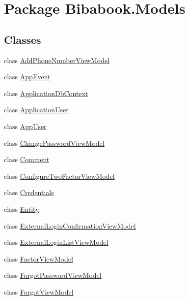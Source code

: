 \hypertarget{namespace_bibabook_1_1_models}{}\section{Package Bibabook.\+Models}
\label{namespace_bibabook_1_1_models}
\subsection*{Classes}
\begin{DoxyCompactItemize}
\item 
class \hyperlink{class_bibabook_1_1_models_1_1_add_phone_number_view_model}{Add\+Phone\+Number\+View\+Model}
\item 
class \hyperlink{class_bibabook_1_1_models_1_1_app_event}{App\+Event}
\item 
class \hyperlink{class_bibabook_1_1_models_1_1_application_db_context}{Application\+Db\+Context}
\item 
class \hyperlink{class_bibabook_1_1_models_1_1_application_user}{Application\+User}
\item 
class \hyperlink{class_bibabook_1_1_models_1_1_app_user}{App\+User}
\item 
class \hyperlink{class_bibabook_1_1_models_1_1_change_password_view_model}{Change\+Password\+View\+Model}
\item 
class \hyperlink{class_bibabook_1_1_models_1_1_comment}{Comment}
\item 
class \hyperlink{class_bibabook_1_1_models_1_1_configure_two_factor_view_model}{Configure\+Two\+Factor\+View\+Model}
\item 
class \hyperlink{class_bibabook_1_1_models_1_1_credentials}{Credentials}
\item 
class \hyperlink{class_bibabook_1_1_models_1_1_entity}{Entity}
\item 
class \hyperlink{class_bibabook_1_1_models_1_1_external_login_confirmation_view_model}{External\+Login\+Confirmation\+View\+Model}
\item 
class \hyperlink{class_bibabook_1_1_models_1_1_external_login_list_view_model}{External\+Login\+List\+View\+Model}
\item 
class \hyperlink{class_bibabook_1_1_models_1_1_factor_view_model}{Factor\+View\+Model}
\item 
class \hyperlink{class_bibabook_1_1_models_1_1_forgot_password_view_model}{Forgot\+Password\+View\+Model}
\item 
class \hyperlink{class_bibabook_1_1_models_1_1_forgot_view_model}{Forgot\+View\+Model}

\end{DoxyCompactItemize}
